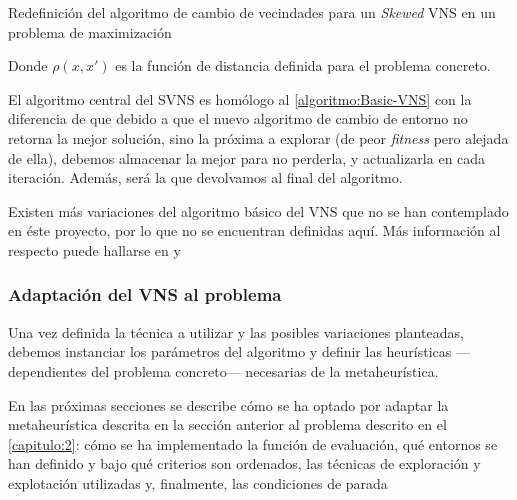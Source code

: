 \begin{algorithm}[h]
	\DontPrintSemicolon
	\bigskip
	
	
	\caption{Redefinición del algoritmo de cambio de vecindades para un \textit{Skewed} VNS en un problema de maximización}
	\label{algoritmo:SVNS-cambio-entornos}
\end{algorithm}

Donde $\rho(x,x')$ es la función de distancia definida para el problema concreto.

El algoritmo central del SVNS es homólogo al \autoref{algoritmo:Basic-VNS} con la diferencia de que debido a que el nuevo algoritmo de cambio de entorno no retorna la mejor solución, sino la próxima a explorar (de peor \textit{fitness} pero alejada de ella), debemos almacenar la mejor para no perderla, y actualizarla en cada iteración. Además, será la que devolvamos al final del algoritmo.

Existen más variaciones del algoritmo básico del VNS que no se han contemplado en éste proyecto, por lo que no se encuentran definidas aquí. Más información al respecto puede hallarse en \cite{vns} y \cite{info-adicional-vns}

\subsubsection{Adaptación del VNS al problema}
\label{apartado:adaptacion-VNS}

Una vez definida la técnica a utilizar y las posibles variaciones planteadas, debemos instanciar los parámetros del algoritmo y definir las heurísticas ---dependientes del problema concreto--- necesarias de la metaheurística.

En las próximas secciones se describe cómo se ha optado por adaptar la metaheurística descrita en la sección anterior al problema descrito en el \autoref{capitulo:2}: cómo se ha implementado la función de evaluación, qué entornos se han definido y bajo qué criterios son ordenados, las técnicas de exploración y explotación utilizadas y, finalmente, las condiciones de parada

